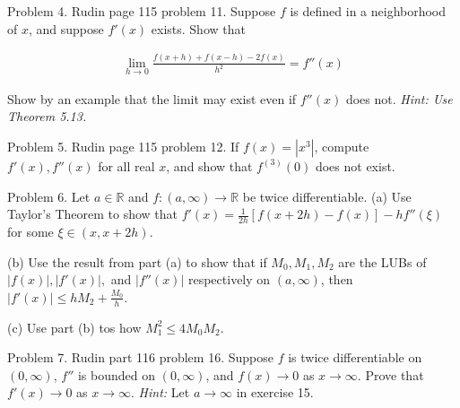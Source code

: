 \documentclass{article}
\begin{document}
  \vspace{1cm}

  \pagebreak

  {\Large \color{Sepia} Problem 4. Rudin page 115 problem 11. Suppose $f$ is defined in a neighborhood of $x$, and suppose $f'(x)$ exists.  Show that

  \begin{align*}
    \lim_{h\to 0} \frac{f(x+h)+f(x-h)-2f(x)}{h^2} = f''(x)
  \end{align*}

  Show by an example that the limit may exist even if $f''(x)$ does not. {\it Hint: Use Theorem 5.13.}}

  \vspace{1cm}

  \pagebreak

  {\Large \color{Sepia} Problem 5. Rudin page 115 problem 12. If $f(x)=|x^3|$, compute $f'(x), f''(x)$ for all real $x$, and show that $f^{(3)}(0)$ does not exist.}

  \vspace{1cm}

  \pagebreak

  {\Large \color{Sepia} Problem 6. Let $a\in \mathbb R$ and $f:(a,\infty)\to \mathbb R$ be twice differentiable. (a) Use Taylor's Theorem to show that $f'(x)=\frac{1}{2h}[f(x+2h)-f(x)]-hf''(\xi)$ for some $\xi \in (x,x+2h)$.}

  \vspace{1cm}

  \vspace{1cm}

  {\Large \color{Sepia} (b) Use the result from part (a) to show that if $M_0,M_1,M_2$ are the LUBs of $|f(x)|,|f'(x)|,$ and $|f''(x)|$ respectively on $(a,\infty)$, then $|f'(x)|\leq hM_2+\frac{M_0}{h}$.}

  \vspace{1cm}

  \vspace{1cm}

  {\Large \color{Sepia} (c) Use part (b) tos how $M_1^2\leq 4M_0M_2$.}

  \vspace{1cm}

  \pagebreak

  {\Large \color{Sepia} Problem 7. Rudin part 116 problem 16. Suppose $f$ is twice differentiable on $(0,\infty)$, $f''$ is bounded on $(0,\infty)$, and $f(x)\to 0$ as $x\to \infty$.  Prove that $f'(x)\to 0$ as $x\to \infty$.  {\it Hint:} Let $a\to \infty$ in exercise 15.}
\end{document}
